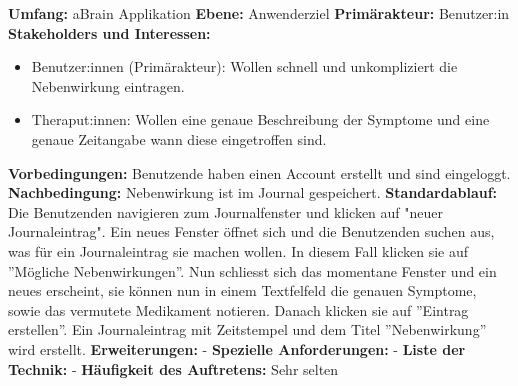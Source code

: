 \textbf{Umfang:} aBrain Applikation \newline \newline
\textbf{Ebene:} Anwenderziel \newline \newline
\textbf{Primärakteur:} Benutzer:in \newline \newline
\textbf{Stakeholders und Interessen:}  
\begin{itemize}
	\item Benutzer:innen (Primärakteur): Wollen schnell und unkompliziert die Nebenwirkung eintragen. 
	\item Theraput:innen: Wollen eine genaue Beschreibung der Symptome und eine genaue Zeitangabe wann diese eingetroffen sind.
\end{itemize}
\textbf{Vorbedingungen:} Benutzende haben einen Account erstellt und sind eingeloggt. \newline \newline
\textbf{Nachbedingung:} Nebenwirkung ist im Journal gespeichert.  \newline \newline
\textbf{Standardablauf:} Die Benutzenden navigieren zum Journalfenster und klicken auf "neuer Journaleintrag". Ein neues Fenster öffnet sich und die Benutzenden suchen aus, was für ein Journaleintrag sie machen wollen. In diesem Fall klicken sie auf ''Mögliche Nebenwirkungen''. Nun schliesst sich das momentane Fenster und ein neues erscheint, sie können nun in einem Textfelfeld die genauen Symptome, sowie das vermutete Medikament notieren. Danach klicken sie auf ''Eintrag erstellen''. Ein Journaleintrag mit Zeitstempel und dem Titel ''Nebenwirkung'' wird erstellt.  \newline \newline
\textbf{Erweiterungen:} - 
\textbf{Spezielle Anforderungen:} -
\textbf{Liste der Technik:} -
\textbf{Häufigkeit des Auftretens:} Sehr selten \newline \newline

